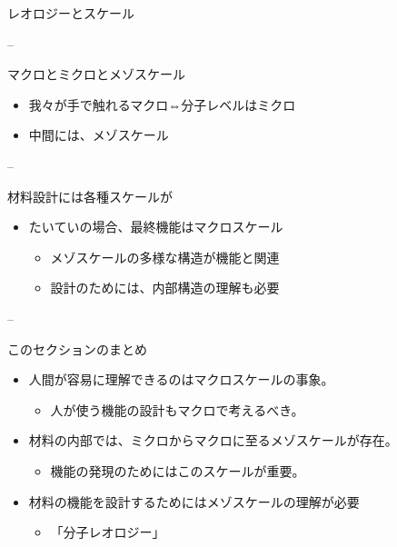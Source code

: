 \begin{frame}{レオロジーとスケール}

--

\begin{block}{マクロとミクロとメゾスケール}

\begin{itemize}

\item
  我々が手で触れるマクロ⇔分子レベルはミクロ
\item
  中間には、メゾスケール
\end{itemize}

--

\end{block}

\begin{block}{材料設計には各種スケールが}

\begin{itemize}

\item
  たいていの場合、最終機能はマクロスケール

  \begin{itemize}
  
  \item
    メゾスケールの多様な構造が機能と関連
  \item
    設計のためには、内部構造の理解も必要
  \end{itemize}
\end{itemize}

--

\end{block}

\end{frame}

\begin{frame}{このセクションのまとめ}

\begin{itemize}

\item
  人間が容易に理解できるのはマクロスケールの事象。

  \begin{itemize}
  
  \item
    人が使う機能の設計もマクロで考えるべき。
  \end{itemize}
\item
  材料の内部では、ミクロからマクロに至るメゾスケールが存在。

  \begin{itemize}
  
  \item
    機能の発現のためにはこのスケールが重要。
  \end{itemize}
\item
  {材料の機能を設計するためにはメゾスケールの理解が必要}

  \begin{itemize}
  
  \item
    「分子レオロジー」
  \end{itemize}
\end{itemize}

\end{frame}
